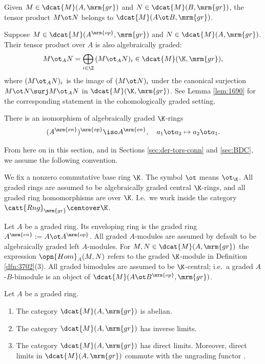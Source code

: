 Given $M \in \dcat{M}(A, \mrm{gr})$ and 
$N \in \dcat{M}(B, \mrm{gr})$, the tensor product 
$M \ot N$ belongs to 
$\dcat{M}(A \ot B, \mrm{gr})$. 

Suppose $M \in \dcat{M}(A^{\mrm{op}}, \mrm{gr})$
and $N \in \dcat{M}(A, \mrm{gr})$.
Their tensor product over $A$ is also algebraically graded:
\begin{equation} \label{eqn:3720}
M \ot_A N = \bigoplus_{i \in \Z} \, (M \ot_A N)_i 
\in \dcat{M}(\K, \mrm{gr}) , 
\end{equation}
where $(M \ot_A N)_i$ is the image of $(M \ot N)_i$ under the canonical 
surjection 
$M \ot N \surj M \ot_A N$
in $\dcat{M}(\K, \mrm{gr})$. 
See Lemma \ref{lem:1690} for the corresponding statement in the cohomologically 
graded setting. 

There is an isomorphism of algebraically graded $\K$-rings
\begin{equation} \label{3721}
(A^{\mrm{en}})^{\mrm{op}} \iso A^{\mrm{en}} , \quad 
a_1 \ot a_2 \mapsto a_2 \ot a_1 . 
\end{equation}

From here on in this section, and in Sections \ref{sec:der-tors-conn}
and \ref{sec:BDC}, we assume the following convention. 

\begin{conv}  \label{conv:3700}
We fix a nonzero commutative base ring $\K$. The symbol $\ot$ means $\ot_{\K}$. 
All graded rings are assumed to be 
algebraically graded central $\K$-rings, and all graded ring homomorphisms are 
over $\K$. I.e.\  we work inside the category 
$\catt{Rng}_{\mrm{gr}} \centover \K$.

Let $A$ be a graded ring. Its enveloping ring is the graded ring 
$A^{\mrm{en}} := A \ot A^{\mrm{op}}$. 
All graded $A$-modules are assumed by default to be 
algebraically graded left $A$-modules.
For $M, N \in \dcat{M}(A, \mrm{gr})$ the expression 
$\opn{Hom}_A(M, N)$ refers to the graded $\K$-module in Definition 
\ref{dfn:3702}(3). 
All graded bimodules are assumed to be $\K$-central;  i.e.\ a graded
$A$-$B$-bimodule is an object of
$\dcat{M}(A \ot B^{\mrm{op}}, \mrm{gr})$.
\end{conv}

\begin{prop} \label{prop:3825}
Let $A$ be a graded ring. 
\begin{enumerate}
\item The category $\dcat{M}(A, \mrm{gr})$ is abelian. 

\item The category $\dcat{M}(A, \mrm{gr})$ has inverse limits. 

\item The category $\dcat{M}(A, \mrm{gr})$ has direct limits. Moreover, direct 
limits in $\dcat{M}(A, \mrm{gr})$ commute with the ungrading functor
\tup{(\ref{eqn:3715})}.
\end{enumerate}
\end{prop}

